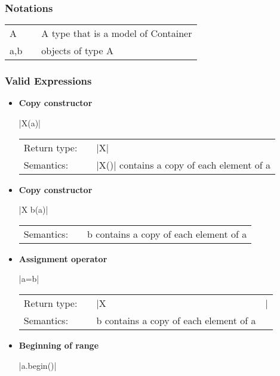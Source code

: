 \documentclass[12pt,twoside]{report}
\begin{document}
\htmlrule[CLEAR=all]  \subsubsection*{Notations}

\begin{tabular}[!h]{l l l}
A & & A type that is a model of Container\\
a,b & & objects of type A\\
\end{tabular}




\htmlrule[CLEAR=all]  \subsubsection*{Valid Expressions}
\begin{itemize}

  \item {\bf Copy constructor}
    
    |X(a)|
    
    \begin{tabular}[!h]{l p{1cm} p{10cm}}
      Return type: & & |X| \\
      Semantics: & & |X()| contains a copy of each element of a\\
    \end{tabular}
  

\item {\bf Copy constructor}
    
    |X b(a)|
    
    \begin{tabular}[!h]{l p{1cm} p{10cm}}
      Semantics: & & b contains a copy of each element of a\\
    \end{tabular}
  

\item {\bf Assignment operator}
    
    |a=b|
    
    \begin{tabular}[!h]{l p{1cm} p{10cm}}
      Return type: & & |X&| \\
      Semantics: & & b contains a copy of each element of a\\
    \end{tabular}
  

\item {\bf Beginning of range}
    
    |a.begin()|
    

\end{itemize}
\end{document}
